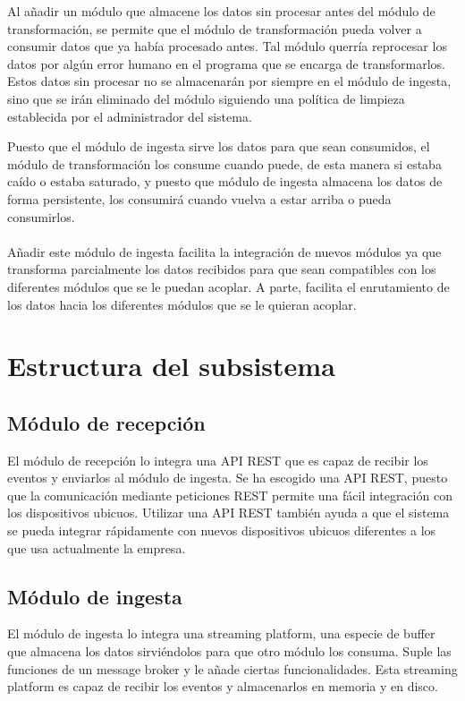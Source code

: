 Al añadir un módulo que almacene los datos sin procesar antes del módulo de transformación, se permite que el módulo de transformación pueda volver a consumir datos que ya había procesado antes. Tal módulo querría reprocesar los datos por algún error humano en el programa que se encarga de transformarlos. Estos datos sin procesar no se almacenarán por siempre en el módulo de ingesta, sino que se irán eliminado del módulo siguiendo una política de limpieza establecida por el administrador del sistema.

Puesto que el módulo de ingesta sirve los datos para que sean consumidos, el módulo de transformación los consume cuando puede, de esta manera si estaba caído o estaba saturado, y puesto que módulo de ingesta almacena los datos de forma persistente, los consumirá cuando vuelva a estar arriba o pueda consumirlos.
\\\\
Añadir este módulo de ingesta facilita la integración de nuevos módulos ya que transforma parcialmente los datos recibidos para que sean compatibles con los diferentes módulos que se le puedan acoplar. A parte, facilita el enrutamiento de los datos hacia los diferentes módulos que se le quieran acoplar.

\section{Estructura del subsistema}

\subsection{Módulo de recepción}
El módulo de recepción lo integra una API REST que es capaz de recibir los eventos y enviarlos al módulo de ingesta. Se ha escogido una API REST, puesto que la comunicación mediante peticiones REST permite una fácil integración con los dispositivos ubicuos. Utilizar una API REST también ayuda a que el sistema se pueda integrar rápidamente con nuevos dispositivos ubicuos diferentes a los que usa actualmente la empresa.

\subsection{Módulo de ingesta}
El módulo de ingesta lo integra una streaming platform, una especie de buffer que almacena los datos sirviéndolos para que otro módulo los consuma. Suple las funciones de un message broker\cite{Tfg:messagebroker} y le añade ciertas funcionalidades. Esta streaming platform es capaz de recibir los eventos y almacenarlos en memoria y en disco.


